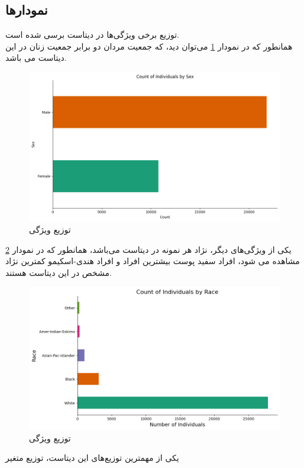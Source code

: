 \documentclass{article}
\begin{document}
	\subsection{نمودار‌ها}
	توزیع برخی ویژگی‌ها در دیتاست برسی شده است.\\
	همانطور که در نمودار 
	\ref{fig: sex dist}
	می‌توان دید، که جمعیت مردان دو برابر جمعیت زنان در این دیتاست می باشد.
	\begin{figure}[H]
		\centering
		\includegraphics[scale=0.5]{figs/sex_dist}
		\caption{
			توزیع ویژگی 
		}
		\label{fig: sex dist}
	\end{figure}
			یکی از ویژگی‌های دیگر، نژاد هر نمونه در دیتاست می‌باشد، همانطور که در نمودار
			\ref{fig: race dist}
			 مشاهده می شود، افراد سفید پوست بیشترین افراد و افراد هندی-اسکیمو کمترین نژاد مشخص در این دیتاست هستند.
	\begin{figure}[H]
		\centering
		\includegraphics[scale=0.5]{figs/Race_dist}
		\caption{
			توزیع ویژگی 
		}
		\label{fig: race dist}
	\end{figure}
	یکی از مهمترین توزیع‌های این دیتاست، توزیع متغیر 
\end{document}
